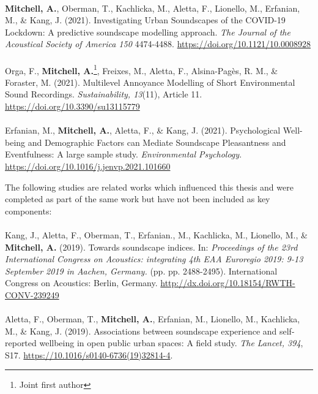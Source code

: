 \documentclass[twoside,fontsize=12pt,titlepage,chapterprefix=true
]{scrbook}
\begin{document}
\paragraph*{}
\textbf{Mitchell, A.}, Oberman, T., Kachlicka, M., Aletta, F., Lionello, M., Erfanian, M., \& Kang, J. (2021). Investigating Urban Soundscapes of the COVID-19 Lockdown: A predictive soundscape modelling approach. \emph{The Journal of the Acoustical Society of America 150} 4474-4488. \url{https://doi.org/10.1121/10.0008928}

\paragraph*{}
Orga, F., \textbf{Mitchell, A.}\footnote{Joint first author}, Freixes, M., Aletta, F., Alsina-Pagès, R. M., \& Foraster, M. (2021). Multilevel Annoyance Modelling of Short Environmental Sound Recordings. \emph{Sustainability, 13}(11), Article 11. \url{https://doi.org/10.3390/su13115779}

\paragraph*{}
Erfanian, M., \textbf{Mitchell, A.}, Aletta, F., \& Kang, J. (2021). Psychological Well-being and Demographic Factors can Mediate Soundscape Pleasantness and Eventfulness: A large sample study. \emph{Environmental Psychology}. \url{https://doi.org/10.1016/j.jenvp.2021.101660}


\newpage
The following studies are related works which influenced this thesis and were completed as part of the same work but have not been included as key components:

\paragraph*{}
Kang, J., Aletta, F., Oberman, T., Erfanian., M., Kachlicka, M., Lionello, M., \& \textbf{Mitchell, A.} (2019). Towards soundscape indices. In: \emph{Proceedings of the 23rd International Congress on Acoustics: integrating 4th EAA Euroregio 2019: 9-13 September 2019 in Aachen, Germany.} (pp. pp. 2488-2495). International Congress on Acoustics: Berlin, Germany. \url{http://dx.doi.org/10.18154/RWTH-CONV-239249}

\paragraph*{}
Aletta, F., Oberman, T., \textbf{Mitchell, A.}, Erfanian, M., Lionello, M., Kachlicka, M., \& Kang, J. (2019). Associations between soundscape experience and self-reported wellbeing in open public urban spaces: A field study. \emph{The Lancet, 394}, S17. \url{https://10.1016/s0140-6736(19)32814-4}.
\end{document}

